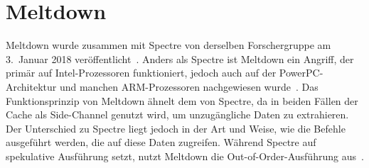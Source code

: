 \section{Meltdown}\label{sec:meltdown}
Meltdown wurde zusammen mit Spectre von derselben Forschergruppe am 3.~Januar 2018 veröffentlicht~\cite{kocher2018spectre}.
Anders als Spectre ist Meltdown ein Angriff, der primär auf Intel-Prozessoren funktioniert, jedoch auch auf der PowerPC-Architektur und manchen ARM-Prozessoren nachgewiesen wurde~\cite{cve_2024_45333}.
Das Funktionsprinzip von Meltdown ähnelt dem von Spectre, da in beiden Fällen der Cache als Side-Channel genutzt wird, um unzugängliche Daten zu extrahieren.
Der Unterschied zu Spectre liegt jedoch in der Art und Weise, wie die Befehle ausgeführt werden, die auf diese Daten zugreifen.
Während Spectre auf spekulative Ausführung setzt, nutzt Meltdown die Out-of-Order-Ausführung aus~\cite{kocher2018meltdown}.

